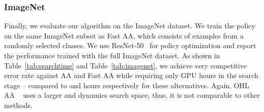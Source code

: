\documentclass[runningheads]{llncs}
\begin{document}
\subsubsection{ImageNet}
Finally, we evaluate our algorithm on the ImageNet dataset.
We train the policy on the same 
ImageNet subset as
Fast AA, which consists of  examples from a randomly selected  classes.
We use
ResNet-50~\cite{DBLP:conf/cvpr/HeZRS16} for policy optimization
and report the performance trained with the full ImageNet dataset.
As shown in Table~\ref{tab:searchtime} and Table~\ref{tab:imagenet},
we achieve very competitive error rate against
AA and Fast AA while requiring only  GPU hours in the search stage -- compared to  and  hours respectively for these alternatives. 
Again, OHL AA ~\cite{Lin_2019_ICCV} uses a larger and dynamics search space, thus, it is not comparable to other methods. 
\end{document}
